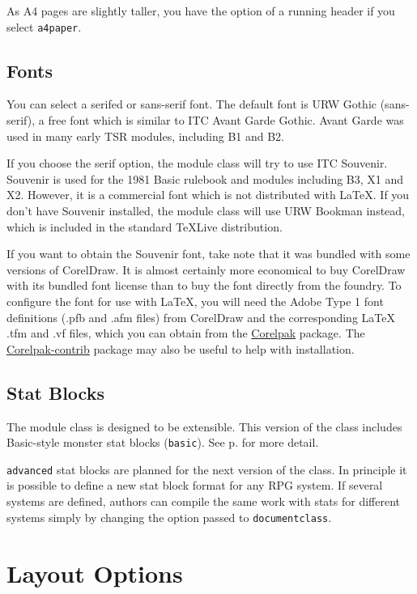\documentclass[letterpaper,serif]{module}
\begin{document}
As A4 pages are slightly taller, you have the option of a running header if you select \verb|a4paper|.

\subsection*{Fonts}

You can select a serifed or sans-serif font. The default font is URW Gothic (sans-serif), a free font which is similar to
ITC Avant Garde Gothic. Avant Garde was used in many early TSR modules, including B1 and B2.

If you choose the serif option, the module class will try to use ITC Souvenir. Souvenir is used for the 1981 Basic rulebook
and modules including B3, X1 and X2. However, it is a commercial font which is not distributed with \LaTeX. If you don't have
Souvenir installed, the module class will use URW Bookman instead, which is included in the standard \TeX Live distribution.

If you want to obtain the Souvenir font, take note that it was bundled with some versions of CorelDraw.
It is almost certainly more economical to buy CorelDraw with its bundled font license than to buy the font directly from the foundry.
To configure the font for use with \LaTeX, you will need the Adobe Type 1 font definitions (.pfb and .afm files) from CorelDraw
and the corresponding LaTeX .tfm and .vf files, which you can obtain from the \href{https://www.ctan.org/pkg/corelpak}{Corelpak} package. The
\href{https://www.ctan.org/pkg/corelpak-contrib}{Corelpak-contrib} package may also be useful to help with installation.

\subsection*{Stat Blocks}

The module class is designed to be extensible.
This version of the class includes Basic-style monster stat blocks (\verb|basic|). See p.\pageref{stat_blocks} for more detail.

\verb|advanced| stat blocks are planned for the next version of the class. In principle it is possible to define a new stat
block format for any RPG system. If several systems are defined, authors can compile the same work with stats for different
systems simply by changing the option passed to \verb|documentclass|.

\section{Layout Options}
\end{document}
